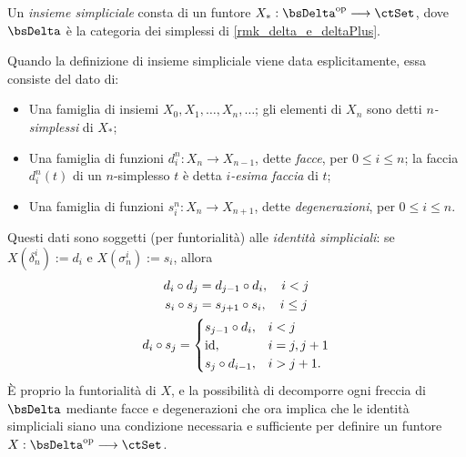 \begin{definition}\label{def_insieme_simpliciale}
	Un \emph{insieme simpliciale} consta di un funtore \(X_* : \bsDelta^\op\fun\ctSet\), dove \(\bsDelta\) è la categoria dei simplessi di \ref{rmk_delta_e_deltaPlus}.

	Quando la definizione di insieme simpliciale viene data esplicitamente, essa consiste del dato di:
	\begin{itemize}
		\item Una famiglia di insiemi \(X_0,X_1,\dots,X_n,\dots\); gli elementi di \(X_n\) sono detti	\emph{\(n\)-simplessi} di \(X_*\);
		\item Una famiglia di funzioni \(d_i^n : X_n\to X_{n-1}\), dette \emph{facce}, per \(0\leq i\leq n\); la faccia \(d_i^n(t)\) di un \(n\)-simplesso \(t\) è detta \emph{\(i\)-esima faccia} di \(t\);
		\item Una famiglia di funzioni \(s_i^n : X_n\to X_{n+1}\), dette \emph{degenerazioni}, per \(0\leq i\leq n\).
	\end{itemize}
	Questi dati sono soggetti (per funtorialità) alle \emph{identità simpliciali}: se \(X(\delta_n^i) := d_i\) e \(X(\sigma_n^i) := s_i\), allora
	\begin{gather}
		d_i\circ d_j = d_{j-1}\circ d_i, \quad i < j\label{idsim_1}\\
		s_i \circ s_j = s_{j+1} \circ s_i, \quad i \leq j\label{idsim_2}\\
		d_i\circ s_j =
		\begin{cases}
			s_{j-1}\circ d_i, & i < j      \\
			\mathrm{id},             & i = j, j+1 \\
			s_j\circ d_{i-1}, & i > j+1.
		\end{cases}\label{idsim_3}
	\end{gather}
	\`E proprio la funtorialità di \(X\), e la possibilità di decomporre ogni freccia di \(\bsDelta\) mediante facce e degenerazioni che ora implica che le identità simpliciali siano una condizione necessaria e sufficiente per definire un funtore \(X : \bsDelta^\op\fun\ctSet\).
\end{definition}
